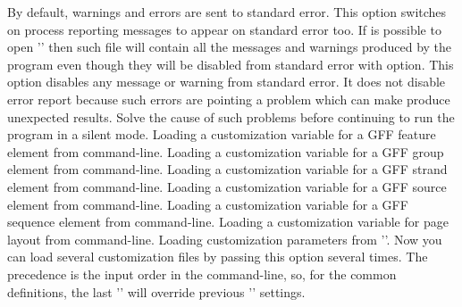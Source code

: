 \begin{description}
By default, warnings and errors are sent to standard error. This option 
switches on process reporting messages to appear on standard error too.
If is possible to open '' then such file will contain 
all the messages and warnings produced by the program even though they 
will be disabled from standard error with  option.
This option disables any message or warning from standard error. It does not 
disable error report because such errors are pointing a problem which can 
make {\prog} produce unexpected results. Solve the cause of such problems 
before continuing to run the program in a silent mode. 
Loading a customization variable for a GFF feature element from command-line. %
Loading a customization variable for a GFF group element from command-line. %
Loading a customization variable for a GFF strand element from command-line. %
Loading a customization variable for a GFF source element from command-line. %
Loading a customization variable for a GFF sequence element from command-line. %
Loading a customization variable for page layout from command-line. %
Loading customization parameters from ''. Now you can load several customization files by passing this option several times. The precedence is the input order in the command-line, so, for the common definitions, the last '' will override previous '' settings.
\clmitem{}
\clmitem{}
\clmitem{}
\clmitem{}
\clmitem{}
\clmitem{}
\clmitem{}
\clmitem{}
\clmitem{}
\clmitem{}
\clmitem{}
\clmitem{}
\clmitem{}
\clmitem{}
\clmitem{}
\clmitem{}
\clmitem{}
\clmitem{}
\clmitem{}
\clmitem{}
\clmitem{}
\clmitem{}
\clmitem{}
\clmitem{}
\clmitem{}
\clmitem{}
\clmitem{}
\clmitem{}
\clmitem{}
\end{description}
